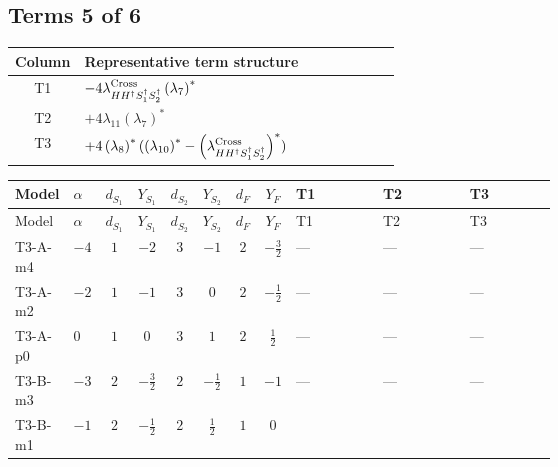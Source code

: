 \documentclass[8pt]{article}
\begin{document}
\begin{landscape}
\subsection*{Terms 5 of 6}
\begin{center}
\begin{tabular}{@{}c >{\raggedright\arraybackslash}p{0.82\linewidth}@{}}
\toprule
Column & Representative term structure \\
\midrule
T1 & \(\displaystyle -4 {\lambda_{H H^\dagger S_1^\dagger S_2^\dagger}^{\rm Cross}} \left({\lambda_{7}}\right)^{*}\) \\
\midrule
T2 & \(\displaystyle +4 {\lambda_{11}} \left({\lambda_{7}}\right)^{*}\) \\
\midrule
T3 & \(\displaystyle +4 \left({\lambda_{8}}\right)^{*} (\left({\lambda_{10}}\right)^{*}-\left({\lambda_{H H^\dagger S_1^\dagger S_2^\dagger}^{\rm Cross}}\right)^{*})\) \\
\midrule
\bottomrule
\end{tabular}
\end{center}
\smallskip
\tiny
\begin{longtable}{@{}llcccccc >{\raggedright\arraybackslash}p{0.21\linewidth} >{\raggedright\arraybackslash}p{0.21\linewidth} >{\raggedright\arraybackslash}p{0.21\linewidth}@{}}
\toprule
Model & $\alpha$ & $d_{S_1}$ & $Y_{S_1}$ & $d_{S_2}$ & $Y_{S_2}$ & $d_F$ & $Y_F$ & T1 & T2 & T3 \\
\midrule
\endfirsthead
\toprule
Model & $\alpha$ & $d_{S_1}$ & $Y_{S_1}$ & $d_{S_2}$ & $Y_{S_2}$ & $d_F$ & $Y_F$ & T1 & T2 & T3 \\
\midrule
\endhead
T3-A-m4 & $-4$ & $1$ & $-2$ & $3$ & $-1$ & $2$ & $-\frac{3}{2}$ & --- & --- & --- \\
\midrule
T3-A-m2 & $-2$ & $1$ & $-1$ & $3$ & $0$ & $2$ & $-\frac{1}{2}$ & --- & --- & --- \\
\midrule
T3-A-p0 & $0$ & $1$ & $0$ & $3$ & $1$ & $2$ & $\frac{1}{2}$ & --- & --- & --- \\
\midrule
T3-B-m3 & $-3$ & $2$ & $-\frac{3}{2}$ & $2$ & $-\frac{1}{2}$ & $1$ & $-1$ & --- & --- & --- \\
\midrule
T3-B-m1 & $-1$ & $2$ & $-\frac{1}{2}$ & $2$ & $\frac{1}{2}$ & $1$ & $0$ & \scriptsize\adjustbox{max width=\linewidth}{$\begin{gathered} -4 {\lambda_{H H^\dagger S_1^\dagger S_2^\dagger}^{\rm Cross}} \left({\lambda_{7}}\right)^{*}\end{gathered}$} & \scriptsize\adjustbox{max width=\linewidth}{$\begin{gathered} +4 {\lambda_{11}} \left({\lambda_{7}}\right)^{*}\end{gathered}$} & \scriptsize\adjustbox{max width=\linewidth}{$\begin{gathered} +4 \left({\lambda_{8}}\right)^{*} (\left({\lambda_{10}}\right)^{*}-\left({\lambda_{H H^\dagger S_1^\dagger S_2^\dagger}^{\rm Cross}}\right)^{*})\end{gathered}$} \\

\end{longtable}
\end{landscape}
\end{document}

